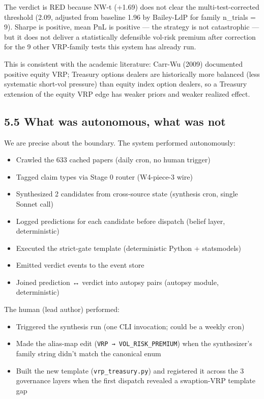 \documentclass[11pt,a4paper]{article}
\begin{document}
The verdict is RED because NW-t (+1.69) does not clear the multi-test-corrected threshold (2.09, adjusted from baseline 1.96 by Bailey-LdP for family n\_trials = 9). Sharpe is positive, mean PnL is positive — the strategy is not catastrophic — but it does not deliver a statistically defensible vol-risk premium after correction for the 9 other VRP-family tests this system has already run.

This is consistent with the academic literature: Carr-Wu (2009) documented positive equity VRP; Treasury options dealers are historically more balanced (less systematic short-vol pressure) than equity index option dealers, so a Treasury extension of the equity VRP edge has weaker priors and weaker realized effect.

\subsection{5.5 What was autonomous, what was not}

We are precise about the boundary. The system performed autonomously:

\begin{itemize}[leftmargin=*]
\item Crawled the 633 cached papers (daily cron, no human trigger)
\item Tagged claim types via Stage 0 router (W4-piece-3 wire)
\item Synthesized 2 candidates from cross-source state (synthesis cron, single Sonnet call)
\item Logged predictions for each candidate before dispatch (belief layer, deterministic)
\item Executed the strict-gate template (deterministic Python + statsmodels)
\item Emitted verdict events to the event store
\item Joined prediction ↔ verdict into autopsy pairs (autopsy module, deterministic)
\end{itemize}

The human (lead author) performed:

\begin{itemize}[leftmargin=*]
\item Triggered the synthesis run (one CLI invocation; could be a weekly cron)
\item Made the alias-map edit (\texttt{VRP → VOL\_RISK\_PREMIUM}) when the synthesizer's family string didn't match the canonical enum
\item Built the new template (\texttt{vrp\_treasury.py}) and registered it across the 3 governance layers when the first dispatch revealed a swaption-VRP template gap
\end{itemize}
\end{document}
